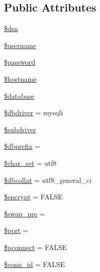 \subsection*{Public Attributes}
\begin{DoxyCompactItemize}
\item 
\mbox{\hyperlink{class_c_i___d_b__driver_a6441cca8c9fa11e16d2017e8cb733c10}{\$dsn}}
\item 
\mbox{\hyperlink{class_c_i___d_b__driver_a0eb82aa5f81cf845de4b36cd653c42cf}{\$username}}
\item 
\mbox{\hyperlink{class_c_i___d_b__driver_a607686ef9f99ea7c42f4f3dd3dbb2b0d}{\$password}}
\item 
\mbox{\hyperlink{class_c_i___d_b__driver_a8bf9ffb42ed554b203b55377d1fc9aa4}{\$hostname}}
\item 
\mbox{\hyperlink{class_c_i___d_b__driver_a7691c0162d89de0b6ba47edcd8ba8878}{\$database}}
\item 
\mbox{\hyperlink{class_c_i___d_b__driver_a0cde2a16322a023d040aa7f725877597}{\$dbdriver}} = \textquotesingle{}mysqli\textquotesingle{}
\item 
\mbox{\hyperlink{class_c_i___d_b__driver_a1322ca756348b11d080cb7a4f590de15}{\$subdriver}}
\item 
\mbox{\hyperlink{class_c_i___d_b__driver_a81398da65aef92236c2bc2e0307f1fa4}{\$dbprefix}} = \textquotesingle{}\textquotesingle{}
\item 
\mbox{\hyperlink{class_c_i___d_b__driver_a0ea660eb249174aefdc2c35238fb1dc8}{\$char\+\_\+set}} = \textquotesingle{}utf8\textquotesingle{}
\item 
\mbox{\hyperlink{class_c_i___d_b__driver_a303eb205131e0266c2a57bcc6a34e80a}{\$dbcollat}} = \textquotesingle{}utf8\+\_\+general\+\_\+ci\textquotesingle{}
\item 
\mbox{\hyperlink{class_c_i___d_b__driver_a1e32803d860e58570971345dddd14d8e}{\$encrypt}} = F\+A\+L\+SE
\item 
\mbox{\hyperlink{class_c_i___d_b__driver_a913c5a5af0c805fe64f884af6028fb73}{\$swap\+\_\+pre}} = \textquotesingle{}\textquotesingle{}
\item 
\mbox{\hyperlink{class_c_i___d_b__driver_aa0787efab4b22e8a212882f3409d4c77}{\$port}} = \textquotesingle{}\textquotesingle{}
\item 
\mbox{\hyperlink{class_c_i___d_b__driver_a5b7c010f6dfe8dfd41ce86fdaed67ebf}{\$pconnect}} = F\+A\+L\+SE
\item 
\mbox{\hyperlink{class_c_i___d_b__driver_a16c23f1dcbfed2f2759f5e54f604106d}{\$conn\+\_\+id}} = F\+A\+L\+SE

\end{DoxyCompactItemize}
